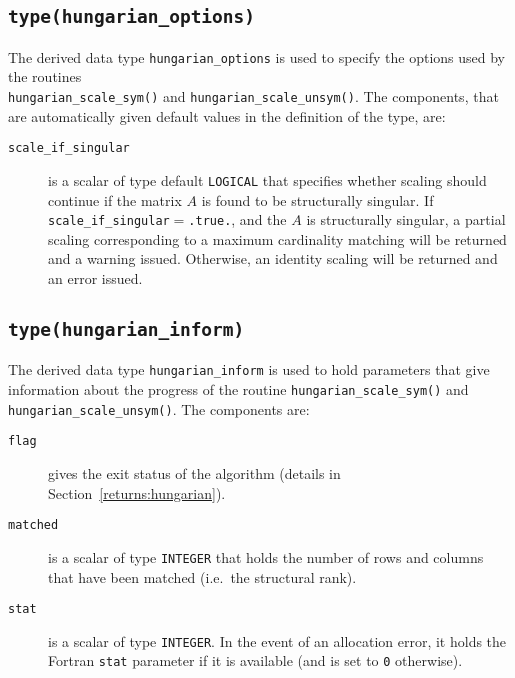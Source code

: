 \subsection{\texttt{type(hungarian\_options)}} \label{type:hungarian_options}

The derived data type \texttt{hungarian\_options} is used to specify the
options used by the routines \\\texttt{hungarian\_scale\_sym()} and \texttt{hungarian\_scale\_unsym()}. The components,
that are automatically given default values in the definition of the type, are:

\begin{description}

\item[\texttt{scale\_if\_singular}] is a scalar of type default \texttt{LOGICAL}
that specifies whether scaling should continue if the matrix $A$ is found to be
structurally singular. If \texttt{scale\_if\_singular}$=$\texttt{.true.},
and the $A$ is structurally singular, a partial scaling corresponding to a
maximum cardinality matching will be returned and a warning issued. Otherwise,
an identity scaling will be returned and an error issued.

\end{description}

\subsection{\texttt{type(hungarian\_inform)}} \label{type:hungarian_inform}

The derived data type \texttt{hungarian\_inform} is used to hold parameters
that give information about the progress of the routine
\texttt{hungarian\_scale\_sym()} and \texttt{hungarian\_scale\_unsym()}. The components are:

\begin{description}

\item[\texttt{flag}] gives the exit status of the algorithm (details in Section~\ref{returns:hungarian}).

\item[\texttt{matched}] is a scalar of type \texttt{INTEGER} that holds the number of rows and columns that have been matched (i.e.~the structural rank).

\item[\texttt{stat}] is a scalar of type \texttt{INTEGER}. In the event of an allocation error, it holds the Fortran \texttt{stat} parameter if it is available (and is set to \texttt{0} otherwise).
\end{description}

